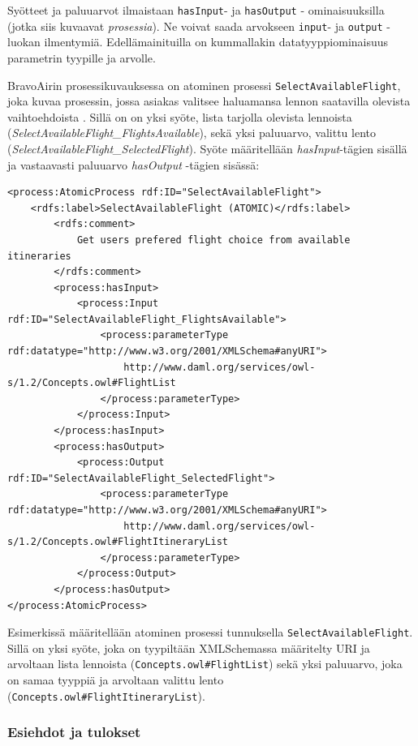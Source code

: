 \documentclass[finnish]{tktltiki2}
\theoremstyle{definition}
\theoremstyle{remark}
\begin{document}
Syötteet ja paluuarvot ilmaistaan \texttt{hasInput}- ja \texttt{hasOutput} - ominaisuuksilla (jotka siis kuvaavat \textit{prosessia}). Ne voivat saada arvokseen \texttt{input}- ja \texttt{output} -luokan ilmentymiä. Edellämainituilla on kummallakin datatyyppiominaisuus parametrin tyypille ja arvolle\cite{OWLS}. 

BravoAirin prosessikuvauksessa on atominen prosessi \texttt{SelectAvailableFlight}, joka kuvaa prosessin, jossa asiakas valitsee haluamansa lennon saatavilla olevista vaihtoehdoista \cite{daml}. Sillä on on yksi syöte, lista tarjolla olevista lennoista (\textit{SelectAvailableFlight\_FlightsAvailable}), sekä yksi paluuarvo, valittu lento (\textit{SelectAvailableFlight\_SelectedFlight}). Syöte määritellään \textit{hasInput}-tägien sisällä ja vastaavasti paluuarvo \textit{hasOutput} -tägien sisässä\cite{daml}:

\footnotesize
\begin{verbatim}
<process:AtomicProcess rdf:ID="SelectAvailableFlight">
    <rdfs:label>SelectAvailableFlight (ATOMIC)</rdfs:label>
        <rdfs:comment>
            Get users prefered flight choice from available itineraries
        </rdfs:comment>
        <process:hasInput>
            <process:Input rdf:ID="SelectAvailableFlight_FlightsAvailable">
                <process:parameterType rdf:datatype="http://www.w3.org/2001/XMLSchema#anyURI">
                    http://www.daml.org/services/owl-s/1.2/Concepts.owl#FlightList
                </process:parameterType>
            </process:Input>
        </process:hasInput>
        <process:hasOutput>
            <process:Output rdf:ID="SelectAvailableFlight_SelectedFlight">
                <process:parameterType rdf:datatype="http://www.w3.org/2001/XMLSchema#anyURI">
                    http://www.daml.org/services/owl-s/1.2/Concepts.owl#FlightItineraryList
                </process:parameterType>
            </process:Output>
        </process:hasOutput>
</process:AtomicProcess>
\end{verbatim}


Esimerkissä määritellään atominen prosessi tunnuksella \texttt{SelectAvailableFlight}. Sillä on yksi syöte, joka on tyypiltään XMLSchemassa määritelty  URI ja arvoltaan lista lennoista (\texttt{Concepts.owl\#FlightList}) sekä yksi paluuarvo, joka on samaa tyyppiä ja arvoltaan valittu lento (\texttt{Concepts.owl\#FlightItineraryList}). 


\subsubsection{Esiehdot ja tulokset}
\end{document}
